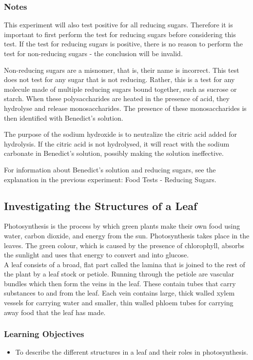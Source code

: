 \subsubsection*{Notes}
This experiment will also test positive for all reducing sugars. Therefore it is important to first perform the test for reducing sugars before considering this test. If the test for reducing sugars is positive, there is no reason to perform the test for non-reducing sugars - the conclusion will be invalid.

Non-reducing sugars are a misnomer, that is, their name is incorrect. This test does not test for any sugar that is not reducing. Rather, this is a test for any molecule made of multiple reducing sugars bound together, such as sucrose or starch. When these polysaccharides are heated in the presence of acid, they hydrolyse and release monosaccharides. The presence of these monosaccharides is then identified with Benedict's solution.

The purpose of the sodium hydroxide is to neutralize the citric acid added for hydrolysis. If the citric acid is not hydrolysed, it will react with the sodium carbonate in Benedict's solution, possibly making the solution ineffective.

For information about Benedict's solution and reducing sugars, see the explanation in the previous experiment: Food Tests - Reducing Sugars.

\subsection{Investigating the Structures of a Leaf}
Photosynthesis is the process by which green plants make their own food using water, carbon dioxide, and energy from the sun. Photosynthesis takes place in the leaves. The green colour, which is caused by the presence of chlorophyll, absorbs the sunlight and uses that energy to convert  and  into glucose. \\A leaf consists of a broad, flat part called the lamina that is joined to the rest of the plant by a leaf stock or petiole. Running through the petiole are vascular bundles which then form the veins in the leaf. These contain tubes that carry substances to and from the leaf. Each vein contains large, thick walled xylem vessels for carrying water and smaller, thin walled phloem tubes for carrying away food that the leaf has made.

\subsubsection*{Learning Objectives}
\begin{itemize}
\item{To describe the different structures in a leaf and their roles in photosynthesis.}
\end{itemize}

